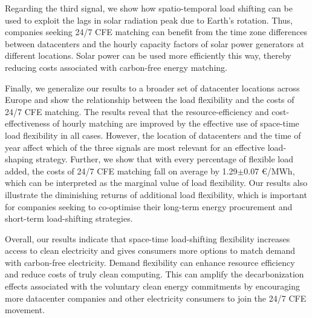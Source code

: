 Regarding the third signal, we show how spatio-temporal load shifting can be used to exploit the lags in solar radiation peak due to Earth's rotation. Thus, companies seeking 24/7 CFE matching can benefit from the time zone differences between datacenters and the hourly capacity factors of solar power generators at different locations. Solar power can be used more efficiently this way, thereby reducing costs associated with carbon-free energy matching.

Finally, we generalize our results to a broader set of datacenter locations across Europe and show the relationship between the load flexibility and the costs of 24/7 CFE matching. The results reveal that the resource-efficiency and cost-effectiveness of hourly matching are improved by the effective use of space-time load flexibility in all cases. However, the location of datacenters and the time of year affect which of the three signals are most relevant for an effective load-shaping strategy. Further, we show that with every percentage of flexible load added, the costs of 24/7 CFE matching fall on average by 1.29$\pm$0.07 \euro/MWh, which can be interpreted as the marginal value of load flexibility. Our results also illustrate the diminishing returns of additional load flexibility, which is important for companies seeking to co-optimise their long-term energy procurement and short-term load-shifting strategies.

Overall, our results indicate that space-time load-shifting flexibility increases access to clean electricity and gives consumers more options to match demand with carbon-free electricity. Demand flexibility can enhance resource efficiency and reduce costs of truly clean computing. This can amplify the decarbonization effects associated with the voluntary clean energy commitments by encouraging more datacenter companies and other electricity consumers to join the 24/7 CFE movement.
